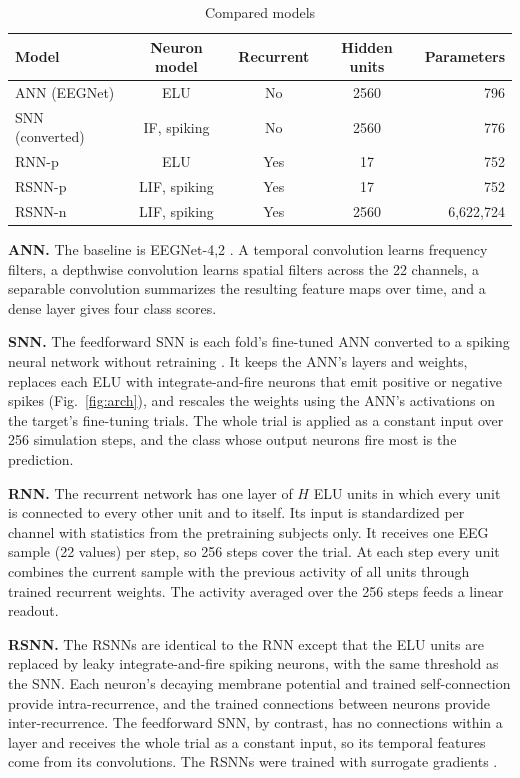 \documentclass[conference]{IEEEtran}
\begin{document}
\begin{table}[!t]
  \centering
  \caption{Compared models}
  \label{tab:models}
  \setlength{\tabcolsep}{4pt}
  \begin{tabular}{lcccr}
    \toprule
    Model & Neuron model & Recurrent & Hidden units & Parameters \\
    \midrule
    ANN (EEGNet) & ELU & No & 2560 & 796 \\
    SNN (converted) & IF, spiking & No & 2560 & 776 \\
    RNN-p & ELU & Yes & 17 & 752 \\
    RSNN-p & LIF, spiking & Yes & 17 & 752 \\
    RSNN-n & LIF, spiking & Yes & 2560 & 6{,}622{,}724 \\
    \bottomrule
  \end{tabular}
\end{table}

\textbf{ANN.} The baseline is EEGNet-4,2 \cite{lawhern2018}. A temporal convolution learns frequency filters, a depthwise convolution learns spatial filters across the 22 channels, a separable convolution summarizes the resulting feature maps over time, and a dense layer gives four class scores.

\textbf{SNN.} The feedforward SNN is each fold's fine-tuned ANN converted to a spiking neural network without retraining \cite{rueckauer2017}. It keeps the ANN's layers and weights, replaces each ELU with integrate-and-fire neurons that emit positive or negative spikes (Fig.~\ref{fig:arch}), and rescales the weights using the ANN's activations on the target's fine-tuning trials. The whole trial is applied as a constant input over 256 simulation steps, and the class whose output neurons fire most is the prediction.

\textbf{RNN.} The recurrent network has one layer of $H$ ELU units in which every unit is connected to every other unit and to itself. Its input is standardized per channel with statistics from the pretraining subjects only. It receives one EEG sample (22 values) per step, so 256 steps cover the trial. At each step every unit combines the current sample with the previous activity of all units through trained recurrent weights. The activity averaged over the 256 steps feeds a linear readout.

\textbf{RSNN.} The RSNNs are identical to the RNN except that the ELU units are replaced by leaky integrate-and-fire spiking neurons, with the same threshold as the SNN. Each neuron's decaying membrane potential and trained self-connection provide intra-recurrence, and the trained connections between neurons provide inter-recurrence. The feedforward SNN, by contrast, has no connections within a layer and receives the whole trial as a constant input, so its temporal features come from its convolutions. The RSNNs were trained with surrogate gradients \cite{neftci2019}.
\end{document}

